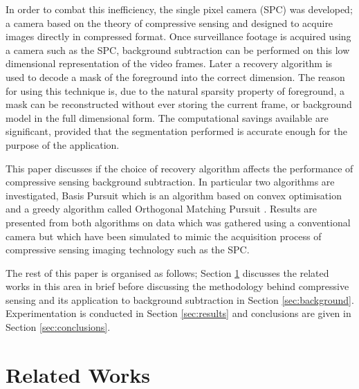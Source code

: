 In order to combat this inefficiency, the single pixel camera (SPC) \cite{Duarte2008a} was developed; a camera based on the theory of compressive sensing \cite{Candes2006, Candes2006a, Donoho2006} and designed to acquire images directly in compressed format. Once surveillance footage is acquired using a camera such as the SPC, background subtraction can be performed on this low dimensional representation of the video frames. Later a recovery algorithm is used to decode a mask of the foreground into the correct dimension. The reason for using this technique is, due to the natural sparsity property of foreground, a mask can be reconstructed without ever storing the current frame, or background model in the full dimensional form. The computational savings available are significant, provided that the segmentation performed is accurate enough for the purpose of the application. 

This paper discusses if the choice of recovery algorithm affects the performance of compressive sensing background subtraction. In particular two algorithms are investigated, Basis Pursuit \cite{Candes2005} which is an algorithm based on convex optimisation \cite{boyd2004convex} and a greedy algorithm called Orthogonal Matching Pursuit \cite{tropp2004}. Results are presented from both algorithms on data which was gathered using a conventional camera but which have been simulated to mimic the acquisition process of compressive sensing imaging technology such as the SPC. 

The rest of this paper is organised as follows; Section \ref{sec:related-works} discusses the related works in this area in brief before discussing the methodology behind compressive sensing and its application to background subtraction in Section \ref{sec:background}. Experimentation is conducted in Section \ref{sec:results} and conclusions are given in Section \ref{sec:conclusions}. 


\section{Related Works}
\label{sec:related-works}

